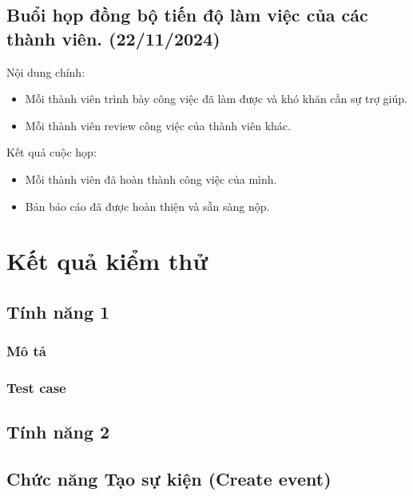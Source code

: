 \documentclass[a4paper, 12pt]{article}
\begin{document}
\subsection{Buổi họp đồng bộ tiến độ làm việc của các thành viên. (22/11/2024)}
Nội dung chính:
\begin{itemize}
    \item Mỗi thành viên trình bày công việc đã làm được và khó khăn cần sự trợ giúp.
    \item Mỗi thành viên review công việc của thành viên khác.
\end{itemize}
Kết quả cuộc họp:
\begin{itemize}
    \item Mỗi thành viên đã hoàn thành công việc của mình.
    \item Bản báo cáo đã được hoàn thiện và sẵn sàng nộp. 
\end{itemize}

\newpage

\section{Kết quả kiểm thử}

\subsection{Tính năng 1}
\subsubsection{Mô tả}
\subsubsection{Test case}
\subsection{Tính năng 2}

\subsection{Chức năng Tạo sự kiện (Create event)}
\end{document}
